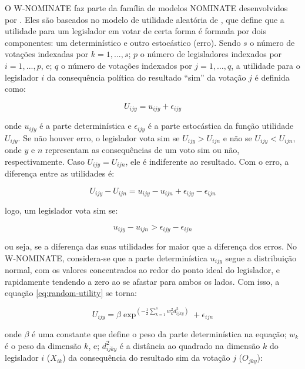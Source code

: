\documentclass[a4paper,titlepage]{ppgi}\usepackage[]{graphicx}\usepackage[]{color}
\begin{document}
O W-NOMINATE faz parte da família de modelos NOMINATE desenvolvidos por
. Eles são baseados no modelo de utilidade aleatória de
, que define que a utilidade para um legislador em
votar de certa forma é formada por dois componentes: um determinístico e outro
estocástico (erro). Sendo $s$ o número de votações indexadas por $k = 1, ...,
s$; $p$ o número de legisladores indexados por $i = 1, ..., p$, e; $q$ o número
de votações indexados por $j = 1, ..., q$, a utilidade para o legislador $i$ da
consequência política do resultado ``sim'' da votação $j$ é definida como:

\begin{equation}
\label{eq:random-utility}
 U_{ijy} = u_{ijy} + \epsilon_{ijy}
\end{equation}

onde $u_{ijy}$ é a parte determinística e $\epsilon_{ijy}$ é a parte
estocástica da função utilidade $U_{ijy}$. Se não houver erro, o legislador vota sim se
$U_{ijy} > U_{ijn}$ e não se $U_{ijy} < U_{ijn}$, onde $y$ e $n$ representam as
consequências de um voto sim ou não, respectivamente. Caso $U_{ijy} = U_{ijn}$,
ele é indiferente ao resultado. Com o erro, a diferença entre as utilidades é:

\begin{equation}
U_{ijy} - U_{ijn} = u_{ijy} - u_{ijn} + \epsilon_{ijy} - \epsilon_{ijn}
\end{equation}

logo, um legislador vota sim se:

\begin{equation}
u_{ijy} - u_{ijn} > \epsilon_{ijy} - \epsilon_{ijn}
\end{equation}

ou seja, se a diferença das suas utilidades for maior que a diferença dos
erros. No W-NOMINATE, considera-se que a parte determinística $u_{ijy}$ segue a
distribuição normal, com os valores concentrados ao redor do ponto ideal do
legislador, e rapidamente tendendo a zero ao se afastar para ambos os lados.
Com isso, a equação \ref{eq:random-utility} se torna:

\begin{equation}
  U_{ijy} = \beta \exp^{\left( - \frac{1}{2} \sum\limits_{k=1}^s w_k^2 d_{ijky}^2 \right)} + \epsilon_{ijn}
\end{equation}

onde $\beta$ é uma constante que define o peso da parte determinística na
equação; $w_k$ é o peso da dimensão $k$, e; $d_{ijky}^2$ é a distância ao
quadrado na dimensão $k$ do legislador $i$ ($X_{ik}$) da consequência do
resultado sim da votação $j$ ($O_{jky}$):
\end{document}
